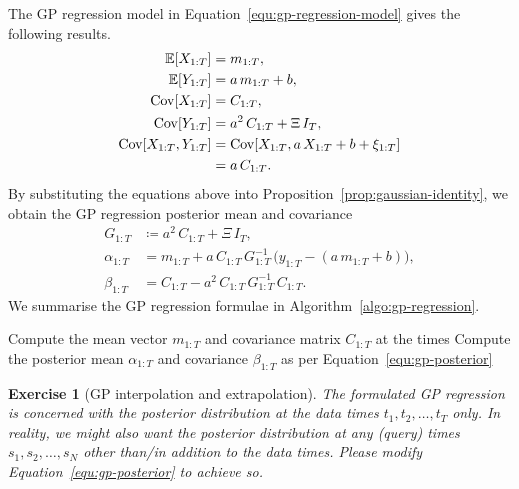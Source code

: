 \documentclass[]{article}
\newtheorem{exercise}[theorem]{Exercise}
\begin{document}
The GP regression model in Equation~\eqref{equ:gp-regression-model} gives the following results.
%
\begin{equation*}
	\begin{split}
		\expec{X_{1:T}} &= m_{1:T}, \\
		\expec{Y_{1:T}} &= a \, m_{1:T} + b, \\
		\cov{X_{1:T}} &= C_{1:T}, \\
		\cov{Y_{1:T}} &= a^2 \, C_{1:T} + \Xi \, I_{T}, \\
		\cov{X_{1:T}, Y_{1:T}} &= \cov{X_{1:T}, a \, X_{1:T} + b + \xi_{1:T}} \\
		&= a \, C_{1:T}.
	\end{split}
\end{equation*}
%
By substituting the equations above into Proposition~\ref{prop:gaussian-identity}, we obtain the GP regression posterior mean and covariance 
%
\begin{equation}
	\begin{split}
		G_{1:T} &\coloneqq a^2 \, C_{1:T} + \Xi \, I_T, \\
		\alpha_{1:T} &= m_{1:T} + a \, C_{1:T} \, G_{1:T}^{-1} \, \big(y_{1:T} - (a \, m_{1:T} + b)\big), \\
		\beta_{1:T} &= C_{1:T} - a^2 \, C_{1:T} \, G_{1:T}^{-1} \, C_{1:T}. 
		\label{equ:gp-posterior}
	\end{split}
\end{equation}
%
We summarise the GP regression formulae in Algorithm~\ref{algo:gp-regression}.

\begin{algorithm}
	\SetAlgoLined
	Compute the mean vector $m_{1:T}$ and covariance matrix $C_{1:T}$ at the times\;
	Compute the posterior mean $\alpha_{1:T}$ and covariance $\beta_{1:T}$ as per Equation~\eqref{equ:gp-posterior}\;
	\caption{GP regression on Equation~\eqref{equ:gp-regression-model}}
	\label{algo:gp-regression}
\end{algorithm}

\begin{exercise}[GP interpolation and extrapolation]
	The formulated GP regression is concerned with the posterior distribution at the data times $t_1, t_2, \ldots, t_T$ only. In reality, we might also want the posterior distribution at any (query) times $s_1, s_2, \ldots, s_N$ other than/in addition to the data times. Please modify Equation~\eqref{equ:gp-posterior} to achieve so.
\end{exercise}
\end{document}
